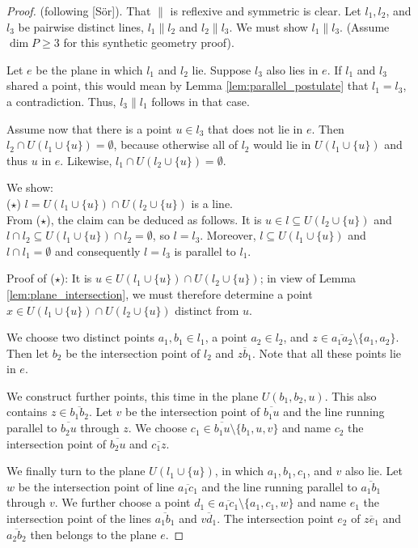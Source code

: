 \documentclass[11pt,a4paper]{article}
\newcommand{\lineab}[1]{\overline{#1}}
\begin{document}
\begin{proof}
(following [S\"or]). That $\parallel$ is reflexive and symmetric is clear. Let $l_1, l_2$, and $l_3$ be pairwise distinct lines, $l_1 \parallel l_2$ and $l_2 \parallel l_3$. We must show $l_1 \parallel l_3$. (Assume $\dim P \ge 3$ for this synthetic geometry proof).

Let $e$ be the plane in which $l_1$ and $l_2$ lie. Suppose $l_3$ also lies in $e$. If $l_1$ and $l_3$ shared a point, this would mean by Lemma \ref{lem:parallel_postulate} that $l_1 = l_3$, a contradiction. Thus, $l_3 \parallel l_1$ follows in that case.

Assume now that there is a point $u \in l_3$ that does not lie in $e$. Then $l_2 \cap U(l_1 \cup \{u\}) = \emptyset$, because otherwise all of $l_2$ would lie in $U(l_1 \cup \{u\})$ and thus $u$ in $e$. Likewise, $l_1 \cap U(l_2 \cup \{u\}) = \emptyset$.

We show: \\
($\star$) $l = U(l_1 \cup \{u\}) \cap U(l_2 \cup \{u\})$ is a line. \\
From ($\star$), the claim can be deduced as follows. It is $u \in l \subseteq U(l_2 \cup \{u\})$ and $l \cap l_2 \subseteq U(l_1 \cup \{u\}) \cap l_2 = \emptyset$, so $l = l_3$. Moreover, $l \subseteq U(l_1 \cup \{u\})$ and $l \cap l_1 = \emptyset$ and consequently $l = l_3$ is parallel to $l_1$.

Proof of ($\star$): It is $u \in U(l_1 \cup \{u\}) \cap U(l_2 \cup \{u\})$; in view of Lemma \ref{lem:plane_intersection}, we must therefore determine a point $x \in U(l_1 \cup \{u\}) \cap U(l_2 \cup \{u\})$ distinct from $u$.

We choose two distinct points $a_1, b_1 \in l_1$, a point $a_2 \in l_2$, and $z \in \lineab{a_1 a_2} \setminus \{a_1, a_2\}$. Then let $b_2$ be the intersection point of $l_2$ and $\lineab{zb_1}$. Note that all these points lie in $e$.

We construct further points, this time in the plane $U(b_1, b_2, u)$. This also contains $z \in \lineab{b_1 b_2}$. Let $v$ be the intersection point of $\lineab{b_1 u}$ and the line running parallel to $\lineab{b_2 u}$ through $z$. We choose $c_1 \in \lineab{b_1 u} \setminus \{b_1, u, v\}$ and name $c_2$ the intersection point of $\lineab{b_2 u}$ and $\lineab{c_1 z}$.

We finally turn to the plane $U(l_1 \cup \{u\})$, in which $a_1, b_1, c_1$, and $v$ also lie. Let $w$ be the intersection point of line $\lineab{a_1 c_1}$ and the line running parallel to $\lineab{a_1 b_1}$ through $v$. We further choose a point $d_1 \in \lineab{a_1 c_1} \setminus \{a_1, c_1, w\}$ and name $e_1$ the intersection point of the lines $\lineab{a_1 b_1}$ and $\lineab{v d_1}$. The intersection point $e_2$ of $\lineab{z e_1}$ and $\lineab{a_2 b_2}$ then belongs to the plane $e$.


\end{proof}
\end{document}

